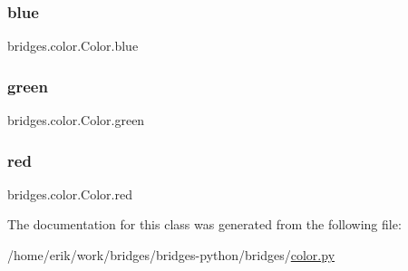 \subsubsection{\texorpdfstring{blue}{blue}}
{\footnotesize\ttfamily bridges.\+color.\+Color.\+blue}

\mbox{\label{classbridges_1_1color_1_1_color_a6f14b2d3ec82052c1aeb259ee687059d}} 
\subsubsection{\texorpdfstring{green}{green}}
{\footnotesize\ttfamily bridges.\+color.\+Color.\+green}

\mbox{\label{classbridges_1_1color_1_1_color_abb0aa417808af0140d3448a2e49d2d15}} 
\subsubsection{\texorpdfstring{red}{red}}
{\footnotesize\ttfamily bridges.\+color.\+Color.\+red}



The documentation for this class was generated from the following file\+:\begin{DoxyCompactItemize}
\item 
/home/erik/work/bridges/bridges-\/python/bridges/\hyperlink{color_8py}{color.\+py}\end{DoxyCompactItemize}
